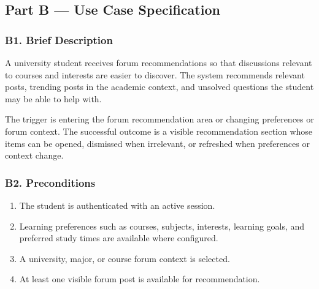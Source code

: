 \documentclass[12pt]{article}
\begin{document}
\hypertarget{sec:part-b-use-case-specification}{}
\subsection*{Part B --- Use Case Specification}
\par\medskip

\hypertarget{sec:b1-brief-description}{}
\subsubsection*{B1. Brief Description}
\par\medskip

A university student receives forum recommendations so that discussions relevant to courses and interests are easier to discover. The system recommends relevant posts, trending posts in the academic context, and unsolved questions the student may be able to help with.
\par\medskip

The trigger is entering the forum recommendation area or changing preferences or forum context. The successful outcome is a visible recommendation section whose items can be opened, dismissed when irrelevant, or refreshed when preferences or context change.
\par\medskip

\hypertarget{sec:b2-preconditions}{}
\subsubsection*{B2. Preconditions}
\par\medskip

\begin{enumerate}
\item The student is authenticated with an active session.
\item Learning preferences such as courses, subjects, interests, learning goals, and preferred study times are available where configured.
\item A university, major, or course forum context is selected.
\item At least one visible forum post is available for recommendation.
\end{enumerate}
\par\medskip
\end{document}
